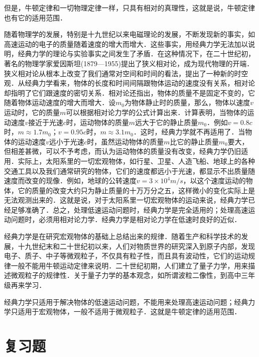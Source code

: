 \begin{Test}
但是，牛顿定律和一切物理定律一样，只具有相对的真理性，这就是说，牛顿定律也有它的适用范围．

随着物理学的发展，特别是十九世纪以来电磁理论的发展，不断发现新的事实，如高速运动的电子的质量随着速度的增大而增大．这些事实，用经典力学无法加以说明，经典力学的理论与实验事实之间发生了矛盾．在这种情况下，在二十世纪初，著名的物理学家爱因斯坦(1879—1955)提出了狭义相对论，成为现代物理的开端．狭义相对论从根本上改变了我们通常对空间和时间的看法，提出了一种新的时空观．从经典力学看来，物体的长度和时间间隔跟物体运动的速度没有关系，相对论却指明了它们跟速度的密切关系．相对论还指出，物体的质量不是固定不变的，它随着物体运动速度的增大而增大．设$m_0$为物体静止时的质量，那么，物体以速度$v$运动时，它的质量$m$可以根据相对论力学的公式计算出来．计算表明，当物体的运动速度$v$接近于光速$c$时，运动物体的质量$m$远大于它的静止质量$m_0$．例如$v=0.8c$时，$m\approx 1.7m_0$；$v=0.95c$时，$m\approx 3.1m_0$．这时，经典力学就不再适用了．当物体的运动速度$v$远小于光速$c$时，虽然运动物体的质量$m$比它的静止质量$m_0$要大，但相差甚微，可以不予考虑，而认为运动物体的质量没有改变，经典力学仍旧适用．实际上，太阳系里的一切宏观物体，如行星、卫星、人造飞船、地球上的各种交通工具以及我们通常研究的物体，它们的速度都远小于光速，都显示不出质量随速度而改变的现像．例如，地球的公转速度$v=3\times 10^4\si{m/s}$，以这个速度运动的物体，它的质量的改变大约只为静止质量的十万万分之五，这样微小的变化实际上是无法观测出来的．这就是说，对于太阳系里一切宏观物体的运动来说，经典力学已经足够准确了．总之，处理低速运动问题时，经典力学是完全适用的；处理高速运动问题时，必须用相对论力学．经典力学是相对论力学在低速时良好的近似．

经典力学是在研究宏观物体的基础上总结出来的规律．随着生产和科学技术的发展，十九世纪末和二十世纪初以来，人们对物质世界的研究深入到原子内部，发现电子、质子、中子等微观粒子，不仅具有粒子性，而且具有波动性，它们的运动规律一般不能用牛顿运动定律来说明．二十世纪初期，人们建立了量子力学，用来描述微观粒子的规律性．关于量子力学的基本观念，如所谓波粒二像性，到高中三年级再来学习．

经典力学只适用于解决物体的低速运动问题，不能用来处理高速运动问题；经典力学只适用于宏观物体，一般不适用于微观粒子．这就是牛顿定律的适用范围．


\section*{复习题}


\end{Test}
